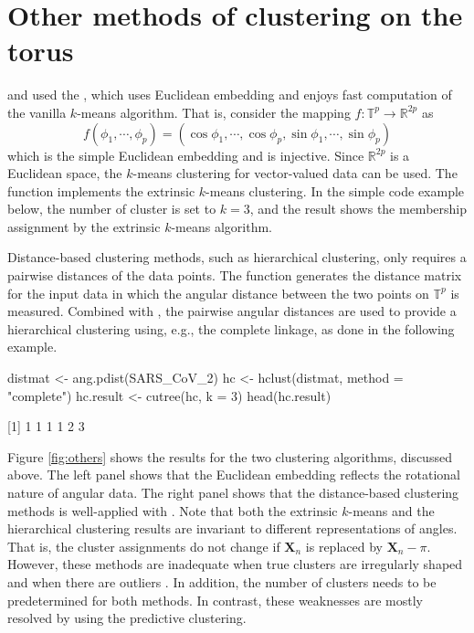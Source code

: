 \section{Other methods of clustering on the torus}

\citet{Gao:2018} and \citet{Jung:2021} used the , which uses Euclidean embedding and enjoys fast computation of the vanilla $k$-means algorithm. That is, consider the mapping $f:\mathbb{T}^p\rightarrow\mathbb{R}^{2p}$
as
$$
f\left(\phi_1,\cdots,\phi_p\right) = \left(\cos{\phi_1},\cdots,\cos{\phi_p},\sin{\phi_1},\cdots,\sin{\phi_p}\right)
$$
which is the simple Euclidean embedding and is injective. Since $\mathbb{R}^{2p}$ is a Euclidean space, the $k$-means clustering for vector-valued data can be used. The function  implements the extrinsic $k$-means clustering. In the simple code example below, the number of cluster is set to $k = 3$,  and the result shows the membership assignment by the extrinsic $k$-means algorithm. 

Distance-based clustering methods, such as hierarchical clustering, only requires a pairwise distances of the data points. The function  generates the distance matrix for the input data in which the angular distance between the two points on $^p$ is measured. Combined with , the pairwise angular distances are used to provide a hierarchical clustering using, e.g., the complete linkage, as done in the following example.
\begin{example}
distmat <- ang.pdist(SARS_CoV_2)
hc <- hclust(distmat, method = "complete")
hc.result <- cutree(hc, k = 3)
head(hc.result)

[1] 1 1 1 1 2 3
\end{example}

Figure \ref{fig:others} shows the results for the two clustering algorithms, discussed above. The left panel shows that the Euclidean embedding reflects the rotational nature of angular data. The right panel shows that the distance-based clustering methods is well-applied with .  Note that both the extrinsic $k$-means and the hierarchical clustering results are invariant to different representations of angles. That is, the cluster assignments do not change if $_n$ is replaced by $_n - \pi$. However, these methods are inadequate when true clusters are irregularly shaped and when there are outliers \citep{Jung:2021}. In addition, the number of clusters needs to be predetermined for both methods. In contrast, these weaknesses are mostly resolved by using the predictive clustering.



